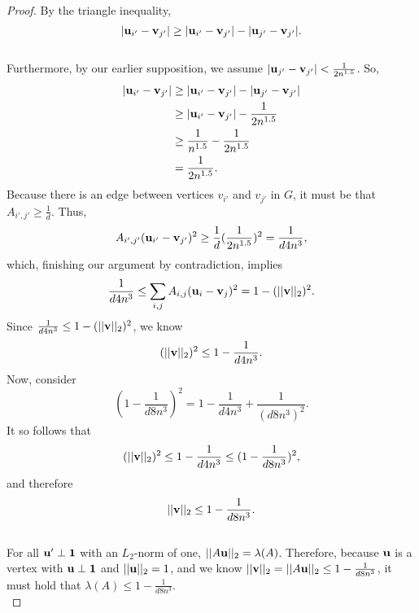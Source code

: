 \documentclass[psamsfonts, 10pt]{amsart}
\theoremstyle{definition}
\theoremstyle{remark}
\numberwithin{equation}{section}
\newcommand{\creturn}{\mbox{}\\}
\begin{document}
\begin{proof}
By the triangle inequality,
\[
\lvert {\bf u}_{i'} - {\bf v}_{j'} \rvert \geq \lvert {\bf u}_{i'} - {\bf v}_{j'} \rvert - \lvert {\bf u}_{j'} - {\bf v}_{j'}\rvert.
\]
\creturn
Furthermore, by our earlier supposition, we assume $\lvert {\bf u}_{j'} - {\bf v}_{j'}\rvert < \frac{1}{2n^{1.5}}$. So,
\[
\begin{aligned}
\lvert {\bf u}_{i'} - {\bf v}_{j'} \rvert &\geq \lvert {\bf u}_{i'} - {\bf v}_{j'} \rvert - \lvert {\bf u}_{j'} - {\bf v}_{j'}\rvert\\
&\geq \lvert {\bf u}_{i'} - {\bf v}_{j'} \rvert - \frac{1}{2n^{1.5}}\\
&\geq \frac{1}{n^{1.5}}- \frac{1}{2n^{1.5}}\\
&= \frac{1}{2n^{1.5}}.\\
\end{aligned}
\]
Because there is an edge between vertices $v_{i'}$ and $v_{j'}$ in $G$, it must be that $A_{i', j'} \geq \frac{1}{d}$. Thus,
\[
A_{i',j'}({\bf u}_{i'} - {\bf v}_{j'})^2 \geq \frac{1}{d}(\frac{1}{2n^{1.5}})^2 = \frac{1}{d4n^3},
\]
which, finishing our argument by contradiction, implies
\[
\frac{1}{d4n^3} \leq  \sum_{i,j}A_{i,j}({\bf u}_i - {\bf v}_j)^2 = 1 - (\lvert \lvert {\bf v} \rvert \rvert_2)^2.
\]
Since $\frac{1}{d4n^3} \leq 1 - (\lvert \lvert {\bf v} \rvert \rvert_2)^2$, we know
\[
(\lvert \lvert {\bf v} \rvert \rvert_2)^2 \leq 1- \frac{1}{d4n^3}.
\]
Now, consider
\[
(1-\frac{1}{d8n^3})^2 = 1 - \frac{1}{d4n^3} + \frac{1}{(d8n^3)^2}.
\]
It so follows that
\[
(\lvert \lvert {\bf v} \rvert \rvert_2)^2 \leq 1- \frac{1}{d4n^3} \leq (1-\frac{1}{d8n^3})^2, 
\]
 and therefore
 \[\lvert \lvert {\bf v} \rvert \rvert_2  \leq 1-\frac{1}{d8n^3}.
 \]
 \\

For all ${\bf u}' \perp {\bf 1}$ with an $L_2$-norm of one, $\lvert\lvert A{\bf u} \rvert\rvert_2 = \lambda(A)$. Therefore, because ${\bf u}$ is a vertex with ${\bf u} \perp {\bf 1}$ and $\lvert \lvert {\bf u} \rvert \rvert _2 = 1$, and we know $\lvert \lvert {\bf v} \rvert \rvert_2 = \lvert \lvert A{\bf u} \rvert \rvert_2 \leq 1-\frac{1}{d8n^3}$, it must hold that $\lambda(A) \leq 1-\frac{1}{d8n^3}$.
\\
\end{proof}
\end{document}
